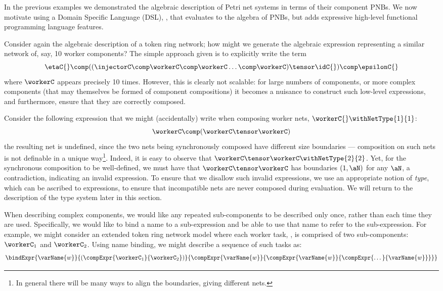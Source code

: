 In the previous examples we demonstrated the algebraic description of Petri net
systems in terms of their component PNBs. We now motivate using a Domain
Specific Language (DSL), \DSL{}, that evaluates to the algebra of PNBs, but
adds expressive high-level functional programming language features.

Consider again the algebraic description of a token ring network; how might we
generate the algebraic expression representing a similar network of, say, 10
worker components? The simple approach given is to explicitly write the term
\[
    \etaC{} \comp ((\injectorC \comp \workerC \comp \workerC \dots \comp
    \workerC) \tensor \idC{}) \comp \epsilonC{}
\]
where $\workerC$ appears precisely 10 times. However, this is clearly not
scalable: for large numbers of components, or more complex components (that may
themselves be formed of component compositions) it becomes a nuisance to
construct such low-level expressions, and furthermore, ensure that they are
correctly composed.

Consider the following expression that we might (accidentally) write
when composing worker nets, $\workerC{} \withNetType{1}{1}$:
\[
    \workerC \comp (\workerC \tensor \workerC)
\]
the resulting net is undefined, since the
two nets being synchronously composed have different size boundaries ---
composition on such nets is not definable in a unique way\footnote{In general
there will be many ways to align the boundaries, giving different nets.}.
Indeed, it is easy to observe that  $\workerC \tensor \workerC
\withNetType{2}{2}$. Yet, for the synchronous composition to be well-defined, we
must have that $\workerC \tensor \workerC$ has boundaries $(1, \aN)$ for any
$\aN$, a contradiction, indicating an invalid expression. To ensure that we
disallow such invalid expressions, we use an appropriate notion of \emph{type},
which can be ascribed to expressions, to ensure that incompatible nets are
never composed during evaluation. We will return to the description of the type
system later in this section.

When describing complex components, we would like any repeated sub-components
to be described only once, rather than each time they are used. Specifically,
we would like to bind a name to a sub-expression and be able to use that name
to refer to the sub-expression.
For example, we might consider an extended token ring network model where each
worker task, \workerC, is comprised of two sub-components: $\workerC_1$
and $\workerC_2$. Using name binding, we might describe a sequence of such
tasks as:
\newcommand{\workerVar}{\varName{w}}
\[
    \bindExpr
        {\workerVar}
        {(\compExpr
            {\workerC_1}
            {\workerC_2})}
        {\compExpr
            {\workerVar}
            {\compExpr{\workerVar}
                      {\compExpr{\dots}{\workerVar}}}}
\]

